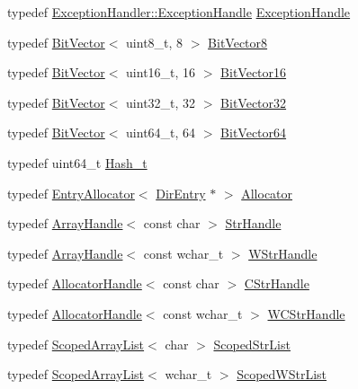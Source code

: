 \begin{DoxyCompactItemize}
typedef \hyperlink{classmocha_1_1_handle}{ExceptionHandler::ExceptionHandle} \hyperlink{namespacemocha_a8220dde327ddabe54222a9f2ae2886f4}{ExceptionHandle}
\item 
typedef \hyperlink{classmocha_1_1_bit_vector}{BitVector}$<$ uint8\_\-t, 8 $>$ \hyperlink{namespacemocha_a0bdb4991eb26767489df7e9d759deb38}{BitVector8}
\item 
typedef \hyperlink{classmocha_1_1_bit_vector}{BitVector}$<$ uint16\_\-t, 16 $>$ \hyperlink{namespacemocha_a766cbe23669a9d992b9ad1ff319262ae}{BitVector16}
\item 
typedef \hyperlink{classmocha_1_1_bit_vector}{BitVector}$<$ uint32\_\-t, 32 $>$ \hyperlink{namespacemocha_a9b5b10536bdac60b1d8c875d99d1d038}{BitVector32}
\item 
typedef \hyperlink{classmocha_1_1_bit_vector}{BitVector}$<$ uint64\_\-t, 64 $>$ \hyperlink{namespacemocha_a83b19de3bb834f897eb5feacd5688a37}{BitVector64}
\item 
typedef uint64\_\-t \hyperlink{namespacemocha_ac43feb383f32d7a0b18fc5866cf9ed5c}{Hash\_\-t}
\item 
typedef \hyperlink{classmocha_1_1_entry_allocator}{EntryAllocator}$<$ \hyperlink{classmocha_1_1_dir_entry}{DirEntry} $\ast$ $>$ \hyperlink{namespacemocha_a9daacf52e373b6cf0a7d9fa5fa99420e}{Allocator}
\item 
typedef \hyperlink{classmocha_1_1_array_handle}{ArrayHandle}$<$ const char $>$ \hyperlink{namespacemocha_a83728e9d5d03d8cdd375fa4dd91c0363}{StrHandle}
\item 
typedef \hyperlink{classmocha_1_1_array_handle}{ArrayHandle}$<$ const wchar\_\-t $>$ \hyperlink{namespacemocha_a2cdd2c4157b1ba7579948fbacc3c5219}{WStrHandle}
\item 
typedef \hyperlink{classmocha_1_1_allocator_handle}{AllocatorHandle}$<$ const char $>$ \hyperlink{namespacemocha_a381f97609b5c47ac31b9a439d9e0a1da}{CStrHandle}
\item 
typedef \hyperlink{classmocha_1_1_allocator_handle}{AllocatorHandle}$<$ const wchar\_\-t $>$ \hyperlink{namespacemocha_adf9965cefc9c7bcef4d9e7c979068061}{WCStrHandle}
\item 
typedef \hyperlink{classmocha_1_1_scoped_array_list}{ScopedArrayList}$<$ char $>$ \hyperlink{namespacemocha_a789a9c499e1720de1c98c4a61b2d05c6}{ScopedStrList}
\item 
typedef \hyperlink{classmocha_1_1_scoped_array_list}{ScopedArrayList}$<$ wchar\_\-t $>$ \hyperlink{namespacemocha_a6601b9f6c9b98b5c7f5dbb9b12674c79}{ScopedWStrList}
\item 

\end{DoxyCompactItemize}
